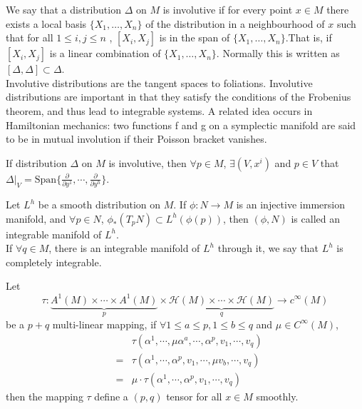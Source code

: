 \begin{newdef}
We say that a distribution $\Delta$ on $M$ is involutive if for every point $x \in M$ there exists a local basis $\{X_{1},\ldots ,X_{n}\}$ of the distribution in a neighbourhood of $x$ such that for all $1\leq i,j\leq n$ , $[X_{i},X_{j}]$  is in the span of $\{X_{1},\ldots ,X_{n}\}$.That is, if $[X_{i},X_{j}]$ is a linear combination of $\{X_{1},\ldots ,X_{n}\}$. Normally this is written as $ [\Delta ,\Delta ]\subset \Delta $.\\
Involutive distributions are the tangent spaces to foliations. Involutive distributions are important in that they satisfy the conditions of the Frobenius theorem, and thus lead to integrable systems.
A related idea occurs in Hamiltonian mechanics: two functions f and g on a symplectic manifold are said to be in mutual involution if their Poisson bracket vanishes.
\end{newdef}

\begin{newthem}
 If distribution $\Delta$ on $M$ is involutive, then $\forall p \in M$, $\exists (V,x^i)$ and $p \in V$ that $\Delta|_{V} = \mathrm{Span} \{ \frac{\partial}{\partial y^1} , \cdots, \frac{\partial}{\partial y^h}\}$.
\end{newthem}

\begin{newdef}
Let $L^{h}$ be a smooth distribution on $M$. If $\phi:N \to M$ is an injective immersion manifold, and $\forall p \in N$, $\phi_{*}(T_pN) \subset L^h(\phi(p))$, then $(\phi,N)$ is called an integrable manifold of $L^h$.\\
If $\forall q \in M$, there is an integrable manifold of $L^h$ through it, we say that $L^h$ is completely integrable.
\end{newdef}
\begin{newthem}
Let
\[\tau: \underbrace{A^1(M) \times \cdots \times A^1(M)}_p \times \underbrace{\mathcal{H}(M) \times \cdots \times \mathcal{H}(M)}_q \to c^{\infty}(M)\] 
be a $p+q$ multi-linear mapping, if $\forall 1 \leq a \leq p,1 \leq b \leq q$ and $\mu \in C^{\infty}(M)$,
\begin{eqnarray}
&&\tau(\alpha^1,\cdots,\mu \alpha^{a},\cdots,\alpha^p,v_1,\cdots,v_q)\nonumber \\
&=&\tau(\alpha^1,\cdots,\alpha^p,v_1,\cdots,\mu v_{b},\cdots,v_q)\nonumber \\
&=&\mu \cdot \tau(\alpha^1,\cdots,\alpha^p,v_1,\cdots,v_q)\nonumber
\end{eqnarray}
then the mapping $\tau$ define a $(p,q)$ tensor for all $x \in M$ smoothly.
\end{newthem}

